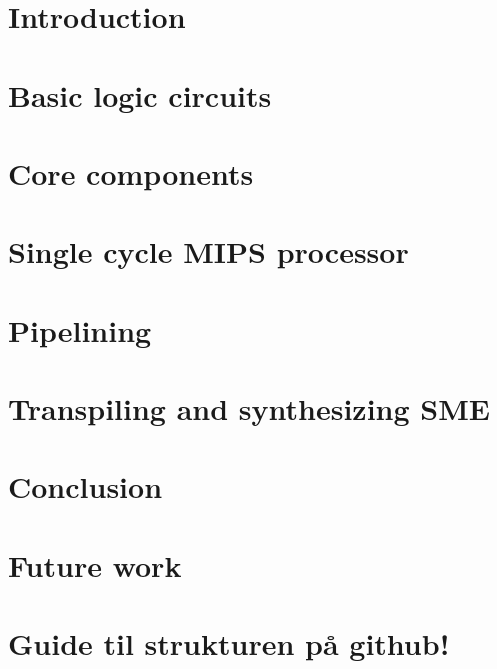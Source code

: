 \documentclass[a4paper]{article}
\begin{document}

\section{Introduction}


%

\section{Basic logic circuits}
\label{sec:logic-circuits}


\section{Core components}
\label{sec:components}


\section{Single cycle MIPS processor}
\label{sec:single-cycle}


\section{Pipelining}
\label{sec:pipelining}


\section{Transpiling and synthesizing SME}
\label{sec:synthesis}


\newpage
\section{Conclusion}


\section{Future work}


\newpage
%

{\small}

\appendix
\section{Guide til strukturen på github!}
\end{document}
